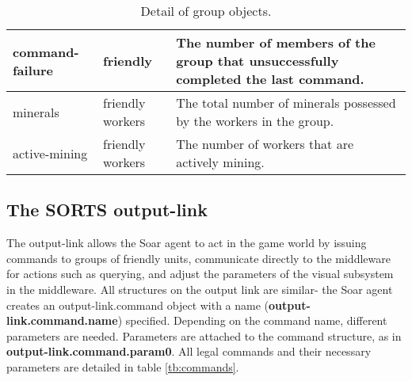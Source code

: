 \begin{center}
\begin{table}[h]
\begin{tabular}{|l|l|p{3.5in}|}
\hline
command-failure & friendly & The number of members of the group that unsuccessfully completed the last command.\\
\hline
minerals & friendly workers & The total number of minerals possessed by the workers in the group.\\
\hline
active-mining & friendly workers & The number of workers that are actively mining.\\
\hline
\end{tabular}
\caption{Detail of group objects.}
\label{tb:groups}
\end{table}
\end{center}

\subsection{The SORTS output-link}
\label{sec:output-link}

The output-link allows the Soar agent to act in the game world by issuing commands to groups of friendly units, communicate directly to the middleware for actions such as querying,
and adjust the parameters of the visual subsystem in the middleware. All structures on the output link are similar- the Soar agent creates an output-link.command object with a name (\textbf{output-link.command.name}) specified. Depending on the command name, different parameters are needed. Parameters are attached to the command structure, as in \textbf{output-link.command.param0}. All legal commands and their necessary parameters are detailed in table \ref{tb:commands}.

